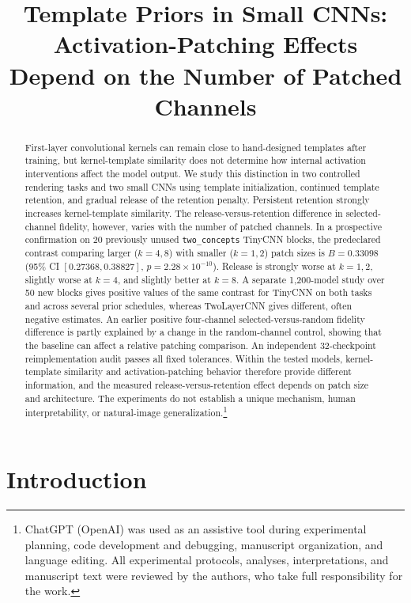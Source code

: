 \documentclass[10pt]{article}
\title{Template Priors in Small CNNs: Activation-Patching Effects Depend on the Number of Patched Channels}
\author{}
\date{}
\begin{document}
\maketitle

\begin{abstract}
First-layer convolutional kernels can remain close to hand-designed templates after training, but kernel-template similarity does not determine how internal activation interventions affect the model output. We study this distinction in two controlled rendering tasks and two small CNNs using template initialization, continued template retention, and gradual release of the retention penalty. Persistent retention strongly increases kernel-template similarity. The release-versus-retention difference in selected-channel fidelity, however, varies with the number of patched channels. In a prospective confirmation on 20 previously unused \texttt{two\_concepts} TinyCNN blocks, the predeclared contrast comparing larger ($k=4,8$) with smaller ($k=1,2$) patch sizes is $B=0.33098$ (95\% CI $[0.27368,0.38827]$, $p=2.28\times10^{-10}$). Release is strongly worse at $k=1,2$, slightly worse at $k=4$, and slightly better at $k=8$. A separate 1,200-model study over 50 new blocks gives positive values of the same contrast for TinyCNN on both tasks and across several prior schedules, whereas TwoLayerCNN gives different, often negative estimates. An earlier positive four-channel selected-versus-random fidelity difference is partly explained by a change in the random-channel control, showing that the baseline can affect a relative patching comparison. An independent 32-checkpoint reimplementation audit passes all fixed tolerances. Within the tested models, kernel-template similarity and activation-patching behavior therefore provide different information, and the measured release-versus-retention effect depends on patch size and architecture. The experiments do not establish a unique mechanism, human interpretability, or natural-image generalization.\footnote{ChatGPT (OpenAI) was used as an assistive tool during experimental planning, code development and debugging, manuscript organization, and language editing. All experimental protocols, analyses, interpretations, and manuscript text were reviewed by the authors, who take full responsibility for the work.}
\end{abstract}

\section{Introduction}\label{sec:introduction}
\end{document}

